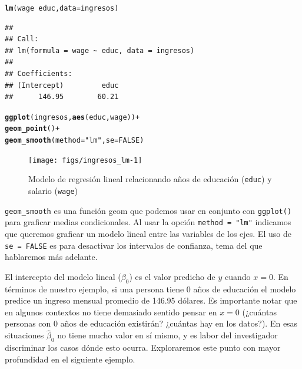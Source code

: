 \documentclass{report}\usepackage[]{graphicx}\usepackage[]{color}
\makeatletter
\newcommand{\hlnum}[1]{\textcolor[rgb]{0.686,0.059,0.569}{#1}}%
\newcommand{\hlstr}[1]{\textcolor[rgb]{0.192,0.494,0.8}{#1}}%
\newcommand{\hlopt}[1]{\textcolor[rgb]{0,0,0}{#1}}%
\newcommand{\hlstd}[1]{\textcolor[rgb]{0.345,0.345,0.345}{#1}}%
\newcommand{\hlkwc}[1]{\textcolor[rgb]{0.333,0.667,0.333}{#1}}%
\newcommand{\hlkwd}[1]{\textcolor[rgb]{0.737,0.353,0.396}{\textbf{#1}}}%
\newenvironment{kframe}{%
 \def\at@end@of@kframe{}%
 \ifinner\ifhmode%
  \def\at@end@of@kframe{\end{minipage}}%
  \begin{minipage}{\columnwidth}%
 \fi\fi%
 \def\FrameCommand##1{\hskip\@totalleftmargin \hskip-\fboxsep
 \colorbox{shadecolor}{##1}\hskip-\fboxsep
     \hskip-\linewidth \hskip-\@totalleftmargin \hskip\columnwidth}%
 \MakeFramed {\advance\hsize-\width
   \@totalleftmargin\z@ \linewidth\hsize
   \@setminipage}}%
 {\par\unskip\endMakeFramed%
 \at@end@of@kframe}
\newenvironment{knitrout}{}{} %
\makeatother
\begin{document}
\begin{knitrout}
\color{fgcolor}\begin{kframe}
\begin{alltt}
\hlkwd{lm}\hlstd{(wage} \hlopt{~} \hlstd{educ,} \hlkwc{data} \hlstd{= ingresos)}
\end{alltt}
\begin{verbatim}
## 
## Call:
## lm(formula = wage ~ educ, data = ingresos)
## 
## Coefficients:
## (Intercept)         educ  
##      146.95        60.21
\end{verbatim}
\begin{alltt}
\hlkwd{ggplot}\hlstd{(ingresos,} \hlkwd{aes}\hlstd{(educ, wage))} \hlopt{+}
  \hlkwd{geom_point}\hlstd{()} \hlopt{+}
  \hlkwd{geom_smooth}\hlstd{(}\hlkwc{method} \hlstd{=} \hlstr{"lm"}\hlstd{,} \hlkwc{se} \hlstd{=} \hlnum{FALSE}\hlstd{)}
\end{alltt}
\end{kframe}\begin{figure}[htb]

{\centering \texttt{[image: figs/ingresos\_lm-1]} 

}

\caption[Modelo de regresión lineal relacionando años de educación (\texttt{educ}) y salario (\texttt{wage})]{Modelo de regresión lineal relacionando años de educación (\texttt{educ}) y salario (\texttt{wage})}\label{fig:ingresos_lm}
\end{figure}


\end{knitrout}
\begin{Rbox}
\verb|geom_smooth| es una función geom que podemos usar en conjunto con \verb|ggplot()| para graficar medias condicionales. Al usar la opción \verb|method = "lm"| indicamos que queremos graficar un modelo lineal entre las variables de los ejes. El uso de \verb|se = FALSE| es para desactivar los intervalos de confianza, tema del que hablaremos más adelante.
\end{Rbox}

El intercepto del modelo lineal ($\beta_0$) es el valor predicho de $y$ cuando $x=0$. En términos de nuestro ejemplo, si una persona tiene 0 años de educación el modelo predice un ingreso mensual promedio de 146.95 dólares.
Es importante notar que en algunos contextos no tiene demasiado sentido pensar en $x=0$ (¿cuántas personas con 0 años de educación existirán? ¿cuántas hay en los datos?). En esas situaciones $\hat\beta_0$ no tiene mucho valor en sí mismo, y es labor del investigador discriminar los casos dónde esto ocurra.
Exploraremos este punto con mayor profundidad en el siguiente ejemplo.
\end{document}
